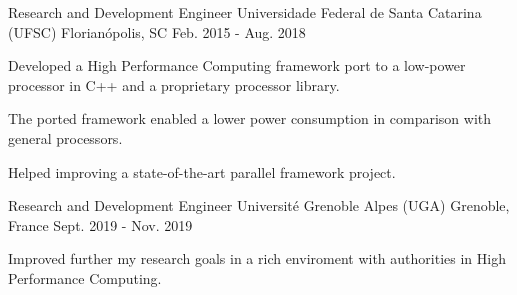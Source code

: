 

\begin{cventries}

  \cventry
    {Research and Development Engineer} %
    {Universidade Federal de Santa Catarina (UFSC)} %
    {Florianópolis, SC} %
    {Feb. 2015 - Aug. 2018} %
    {
      \begin{cvitems} %
        \item {Developed a High Performance Computing framework port to a low-power processor in C++ and a proprietary processor library.}
        \item {The ported framework enabled a lower power consumption in
          comparison with general processors.}
        \item {Helped improving a state-of-the-art parallel framework project.}
      \end{cvitems}
    }

  \cventry
    {Research and Development Engineer} %
    {Université Grenoble Alpes (UGA)} %
    {Grenoble, France} %
    {Sept. 2019 - Nov. 2019} %
    {
      \begin{cvitems} %
      \item {Improved further my research goals in a rich enviroment with
        authorities in High Performance Computing.}
      \end{cvitems}
    }


\end{cventries}
